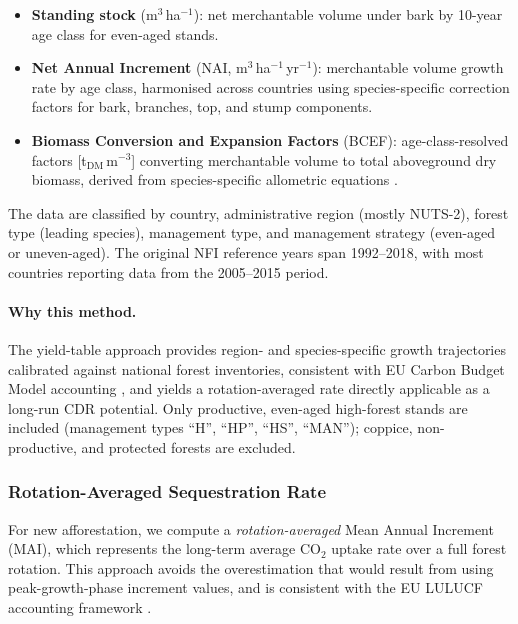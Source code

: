\documentclass[12pt, a4paper]{article}
\begin{document}
\begin{itemize}[leftmargin=2em]
    \item \textbf{Standing stock} (m$^3$\,ha$^{-1}$): net merchantable volume
          under bark by 10-year age class for even-aged stands.
    \item \textbf{Net Annual Increment} (NAI, m$^3$\,ha$^{-1}$\,yr$^{-1}$):
          merchantable volume growth rate by age class, harmonised across
          countries using species-specific correction factors for bark,
          branches, top, and stump components.
    \item \textbf{Biomass Conversion and Expansion Factors} (BCEF):
          age-class-resolved factors [t$_\text{DM}$\,m$^{-3}$]
          converting merchantable volume to total aboveground dry biomass,
          derived from species-specific allometric equations
          \citep{Boudewyn2007}.
\end{itemize}

The data are classified by country, administrative region (mostly NUTS-2),
forest type (leading species), management type, and management strategy
(even-aged or uneven-aged). The original NFI reference years span 1992--2018,
with most countries reporting data from the 2005--2015 period.

\paragraph{Why this method.}
The yield-table approach provides region- and species-specific growth
trajectories calibrated against national forest inventories, consistent with
EU Carbon Budget Model accounting \citep{Grassi2018}, and yields a
rotation-averaged rate directly applicable as a long-run CDR potential.
Only productive, even-aged high-forest stands are included (management types
``H'', ``HP'', ``HS'', ``MAN''); coppice, non-productive, and protected
forests are excluded.

\subsubsection{Rotation-Averaged Sequestration Rate}
\label{sec:affo_mai}

For new afforestation, we compute a \emph{rotation-averaged} Mean Annual
Increment (MAI), which represents the long-term average CO$_2$ uptake rate
over a full forest rotation. This approach avoids the overestimation that
would result from using peak-growth-phase increment values, and is consistent
with the EU LULUCF accounting framework \citep{EU2018841, EU2023839}.
\end{document}
